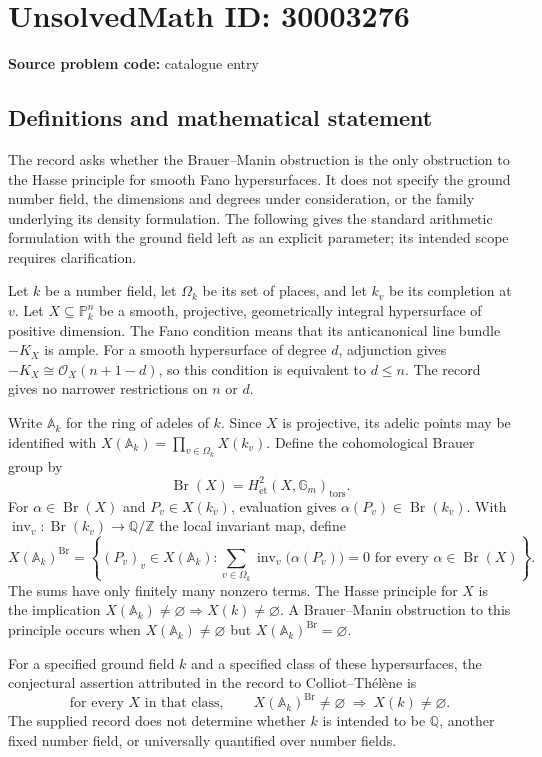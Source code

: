\documentclass[11pt]{article}
\begin{document}
\section*{UnsolvedMath ID: 30003276}
\textbf{Source problem code:} catalogue entry
\subsection{Definitions and mathematical statement}
The record asks whether the Brauer--Manin obstruction is the only obstruction to the Hasse principle for smooth Fano hypersurfaces. It does not specify the ground number field, the dimensions and degrees under consideration, or the family underlying its density formulation. The following gives the standard arithmetic formulation with the ground field left as an explicit parameter; its intended scope requires clarification.

Let \(k\) be a number field, let \(\Omega_k\) be its set of places, and let \(k_v\) be its completion at \(v\). Let \(X\subseteq\mathbb P^n_k\) be a smooth, projective, geometrically integral hypersurface of positive dimension. The Fano condition means that its anticanonical line bundle \(-K_X\) is ample. For a smooth hypersurface of degree \(d\), adjunction gives \(-K_X\cong\mathcal O_X(n+1-d)\), so this condition is equivalent to \(d\leq n\). The record gives no narrower restrictions on \(n\) or \(d\).

Write \(\mathbb A_k\) for the ring of adeles of \(k\). Since \(X\) is projective, its adelic points may be identified with \(X(\mathbb A_k)=\prod_{v\in\Omega_k}X(k_v)\). Define the cohomological Brauer group by
\[
\operatorname{Br}(X)=H^2_{\mathrm{\acute et}}(X,\mathbb G_m)_{\mathrm{tors}}.
\]
For \(\alpha\in\operatorname{Br}(X)\) and \(P_v\in X(k_v)\), evaluation gives \(\alpha(P_v)\in\operatorname{Br}(k_v)\). With \(\operatorname{inv}_v:\operatorname{Br}(k_v)\to\mathbb Q/\mathbb Z\) the local invariant map, define
\[
X(\mathbb A_k)^{\operatorname{Br}}=
\left\{(P_v)_v\in X(\mathbb A_k):
\sum_{v\in\Omega_k}\operatorname{inv}_v\bigl(\alpha(P_v)\bigr)=0
\text{ for every }\alpha\in\operatorname{Br}(X)\right\}.
\]
The sums have only finitely many nonzero terms. The Hasse principle for \(X\) is the implication \(X(\mathbb A_k)\ne\varnothing\Rightarrow X(k)\ne\varnothing\). A Brauer--Manin obstruction to this principle occurs when \(X(\mathbb A_k)\ne\varnothing\) but \(X(\mathbb A_k)^{\operatorname{Br}}=\varnothing\).

For a specified ground field \(k\) and a specified class of these hypersurfaces, the conjectural assertion attributed in the record to Colliot--Th\'el\`ene is
\[
\text{for every }X\text{ in that class},\qquad
X(\mathbb A_k)^{\operatorname{Br}}\ne\varnothing
\ \Longrightarrow\ X(k)\ne\varnothing.
\]
The supplied record does not determine whether \(k\) is intended to be \(\mathbb Q\), another fixed number field, or universally quantified over number fields.
\end{document}
